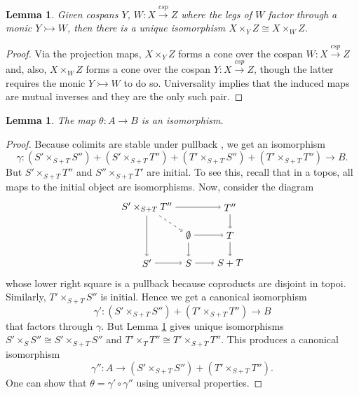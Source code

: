 \documentclass[11pt]{amsart}
\newcommand{\from}{\colon}
\newcommand{\cospan}{\xrightarrow{\mathit{csp}}}
\newtheorem{lem}[thm]{Lemma}
\theoremstyle{remark}
\theoremstyle{definition}
\begin{document}
\begin{lem}
	\label{lem:pullback over subobject}
	Given cospans $Y$, $W \from X \cospan Z$ where the legs of $W$ factor through a monic $Y \rightarrowtail W$, then there is a unique isomorphism $X \times_Y Z \cong X \times_W Z$. 
\end{lem}
\begin{proof}
	Via the projection maps, $X \times_Y Z$ forms a cone over the cospan $W \from X \cospan Z$ and, also, $X \times_W Z$ forms a cone over the cospan $Y \from X \cospan Z$, though the latter requires the monic $Y \rightarrowtail W$ to do so. Universality implies that the induced maps are mutual inverses and they are the only such pair.  
\end{proof}
%
%
%
%
%
%

\begin{lem}
\label{lem.Theta Iso}
	The map $\theta \from A \to B$ is an isomorphism.
\end{lem}
%
%
\begin{proof}
	Because colimits are stable under pullback \cite[Thm.~4.7.2]{MacLaneMoerdijk_SheavesGeomLogic}, we get an isomorphism
	\[
	\gamma \from (S'\times_{S+T}S'')
	+(S'\times_{S+T}T'')
	+(T'\times_{S+T}S'')
	+(T'\times_{S+T}T'') \to B.
	\]
	But $S'\times_{S+T}T''$ and $S''\times_{S+T}T'$ are initial. To see this, recall that in a topos, all maps to the initial object are isomorphisms. Now, consider the diagram
	\[
	\begin{tikzpicture}
		\node (STpb) at (0,2) {$S' \times_{S+T} T''$};
		\node (T'') at (3,2) {$T''$};
		\node (0) at (1.5,1) {$\emptyset$};
		\node (T) at (3,1) {$T$};
		\node (S') at (0,0) {$S'$};
		\node (S) at (1.5,0) {$S$};
		\node (ST) at (3,0) {$S+T$};
		\draw [->] (STpb) edge (S');
		\draw [->] (STpb) edge (T'');
		\draw [->] (STpb) edge[dashed] (0);
		\draw [->] (0) edge (S);
		\draw [->] (0) edge (T);
		\draw [->] (S) edge (ST);
		\draw [->] (T) edge (ST);
		\draw [->] (S') edge (S);
		\draw [->] (T'') edge (T);
	\end{tikzpicture}
	\]
	whose lower right square is a pullback because coproducts are disjoint in topoi.  Similarly, $T'\times_{S+T}S''$ is initial.  Hence we get a canonical isomorphism
	\begin{equation} \label{eq:B second iso}
	\gamma' \from 
	(S'\times_{S+T}S'')+(T'\times_{S+T}T'') 
	\to B
	\end{equation}
	that factors through $\gamma$. But Lemma \ref{lem:pullback over subobject} 
	gives unique isomorphisms $S' \times_{S} S'' \cong S' \times_{S+T} S''$ and $T'\times_{T} T'' \cong T' \times_{S+T} T''$. This produces a canonical isomorphism 
	\[
	\gamma'' \from A \to 
	(S'\times_{S+T}S'')+(T'\times_{S+T}T'').
	\]
	One can show that $\theta = \gamma' \circ 
	\gamma''$ 
	using universal properties.  
\end{proof}
\end{document}

